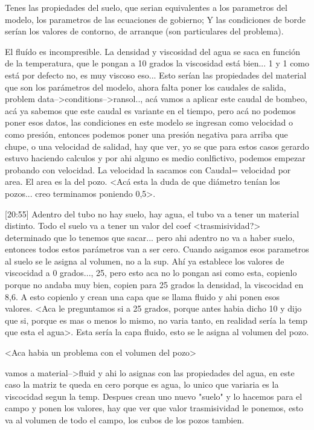 \documentclass[10pt,a4paper,final]{article}
\begin{document}
Tenes las propiedades del suelo, que serian equivalentes a los parametros del modelo, los parametros de las ecuaciones de gobierno; Y las condiciones de borde serían los valores de contorno, de arranque (son particulares del problema).

El fluído es incompresible. La densidad y viscosidad del agua se saca en función de la temperatura, que le pongan a 10 grados la viscosidad está bien... 1 y 1 como está por defecto no, es muy viscoso eso... Esto serían las propiedades del material que son los parámetros del modelo, ahora falta poner los caudales de salida, problem data-->conditions-->ransol.., acá vamos a aplicar este caudal de bombeo, acá ya sabemos que este caudal es variante en el tiempo, pero acá no podemos poner esos datos, las condiciones en este modelo se ingresan como velocidad o como presión, entonces podemos poner una presión negativa para arriba que chupe, o una velocidad de salidad, hay que ver, yo se que para estos casos gerardo estuvo haciendo calculos y por ahi alguno es medio conlfictivo, podemos empezar probando con velocidad. La velocidad la sacamos con Caudal= velocidad por area. El area es la del pozo. <Acá esta la duda de que diámetro tenían los pozos... creo terminamos poniendo 0,5>. 

[20:55]
Adentro del tubo no hay suelo, hay agua, el tubo va a tener un material distinto. Todo el suelo va a tener un valor del coef <trasmisividad?> determinado que lo tenemos que sacar... pero ahi adentro no va a haber suelo, entonces todos estos parámetros van a ser cero. Cuando asigamos esos parametros al suelo se le asigna al volumen, no a la sup. Ahí ya establece los valores de viscocidad a 0 grados..., 25, pero esto aca no lo pongan asi como esta, copienlo porque no andaba muy bien, copien para 25 grados la densidad, la viscocidad en 8,6. A esto copienlo y crean una capa que se llama fluido y ahi ponen esos valores. <Aca le preguntamos si a 25 grados, porque antes habia dicho 10 y dijo que si, porque es mas o menos lo mismo, no varia tanto, en realidad sería la temp que esta el agua>. Esta sería la capa fluido, esto se le asigna al volumen del pozo.

<Aca habia un problema con el volumen del pozo>

vamos a material-->fluid y ahi lo asignas con las propiedades del agua, en este caso la matriz te queda en cero porque es agua, lo unico que variaria es la viscocidad segun la temp. Despues crean uno nuevo "suelo" y lo hacemos para el campo y ponen los valores, hay que ver que valor trasmisividad le ponemos, esto va al volumen de todo el campo, los cubos de los pozos tambien.
\end{document}
